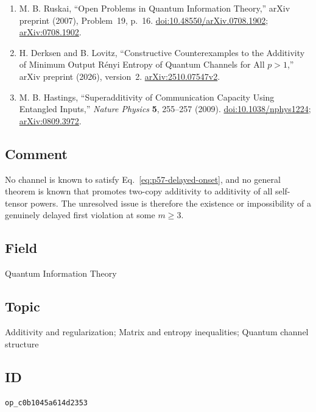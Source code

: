 \begin{enumerate}[label={},leftmargin=4.8em,labelsep=0.5em]
  \footnotesize
  \item[\textup{[Rus07]}]\label{ref:p57-ruskai}
  M. B. Ruskai, ``Open Problems in Quantum Information Theory,''
  arXiv preprint (2007), Problem~19, p.~16.
  \newline
  \href{https://doi.org/10.48550/arXiv.0708.1902}{doi:10.48550/arXiv.0708.1902};
  \href{https://arxiv.org/abs/0708.1902}{arXiv:0708.1902}.

  \item[\textup{[DL26]}]\label{ref:p57-derksen-lovitz}
  H. Derksen and B. Lovitz,
  ``Constructive Counterexamples to the Additivity of Minimum Output
  R\'enyi Entropy of Quantum Channels for All $p>1$,'' arXiv preprint
  (2026), version~2.
  \href{https://arxiv.org/abs/2510.07547v2}{arXiv:2510.07547v2}.

  \item[\textup{[Has09]}]\label{ref:p57-hastings}
  M. B. Hastings,
  ``Superadditivity of Communication Capacity Using Entangled Inputs,''
  \emph{Nature Physics} \textbf{5}, 255--257 (2009).
  \href{https://doi.org/10.1038/nphys1224}{doi:10.1038/nphys1224};
  \href{https://arxiv.org/abs/0809.3972}{arXiv:0809.3972}.
\end{enumerate}

\subsection*{Comment}

No channel is known to satisfy Eq.~\eqref{eq:p57-delayed-onset}, and no
general theorem is known that promotes two-copy additivity to additivity of
all self-tensor powers.  The unresolved issue is therefore the existence or
impossibility of a genuinely delayed first violation at some $m\geq3$.

\subsection*{Field}

Quantum Information Theory

\subsection*{Topic}

Additivity and regularization; Matrix and entropy inequalities; Quantum channel structure

\subsection*{ID}

\texttt{op\_c0b1045a614d2353}
